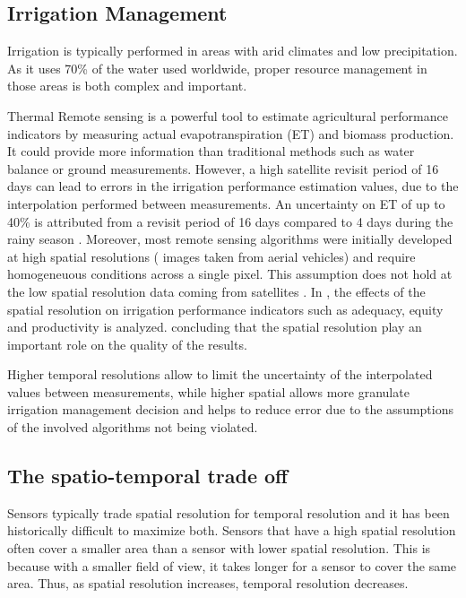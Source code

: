     \subsection{Irrigation Management}

    Irrigation is typically performed in areas with arid climates and low precipitation. As it uses 70\% of the water used worldwide, proper resource management in those areas is both complex and important.

    Thermal Remote sensing is a powerful tool to estimate agricultural performance indicators by measuring actual evapotranspiration (ET) and biomass production. It could provide more information than traditional methods such as water balance or ground measurements.  However, a high satellite revisit period of 16 days can lead to errors in the irrigation performance estimation values, due to the interpolation performed between measurements. An uncertainty on ET of up to 40\% is attributed from a revisit period of 16 days compared to 4 days during the rainy season \cite{rs11050573}. 
    Moreover, most remote sensing algorithms were initially developed at high spatial resolutions ( images taken from aerial vehicles) and require homogeneuous conditions across a single pixel. This assumption does not hold at the low spatial resolution data coming from satellites \cite{rs13081524}.
    In \cite{rs12182949}, the effects of the spatial resolution on irrigation performance indicators such as adequacy, equity and productivity is analyzed. concluding that the spatial resolution play an important role on the quality of the results. 

    Higher temporal resolutions allow to limit the uncertainty of the interpolated values between measurements, while higher spatial allows more granulate irrigation management decision and helps to reduce error due to the assumptions of the involved algorithms not being violated.


    \subsection{The spatio-temporal trade off}

        Sensors typically trade spatial resolution for temporal resolution and  it has been historically difficult to maximize both.
        Sensors that have a high spatial resolution often cover a smaller area than a sensor with lower spatial resolution.
        This is because with a smaller field of view, it takes longer for a sensor to cover the same area. Thus, as spatial resolution increases, temporal resolution decreases.

